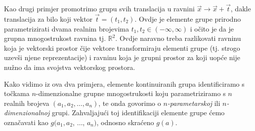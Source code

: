 \centerline{}

Kao drugi primjer promotrimo grupu svih translacija u ravnini $\vec{x}\to\vec{x}+\vec{t}$,
dakle translacija za bilo koji vektor $\vec{t}=(t_1, t_2)$.
Ovdje je elemente grupe prirodno parametrizirati dvama
realnim brojevima $t_1, t_2 \in (-\infty, \infty)$ i očito je da je
 grupna mnogostrukost ravnina tj. $\mathbb{R}^2$. Ovdje naravno treba
 razlikovati ravninu koja je vektorski prostor čije vektore transformiraju
 elementi grupe
 (tj. strogo uzevši njene reprezentacije) i ravninu koja je grupni prostor za koji uopće
 nije nužno da ima svojstva vektorskog prostora.

Kako vidimo iz ova dva primjera, elemente kontinuiranih grupa identificiramo
s točkama $n$-dimenzionalne grupne mnogostrukosti koju
parametriziramo s $n$ realnih brojeva
  $(a_1, a_2, \ldots, a_n)$,
te onda govorimo o \emph{$n$-parametarskoj} ili \emph{$n$-di\-men\-zi\-o\-nal\-noj} grupi.
Zahvaljajući toj identifikaciji
elemente grupe ćemo označavati kao $g(a_1, a_2$, $\ldots$, $a_n)$, odnosno
skraćeno $g(a)$. 

